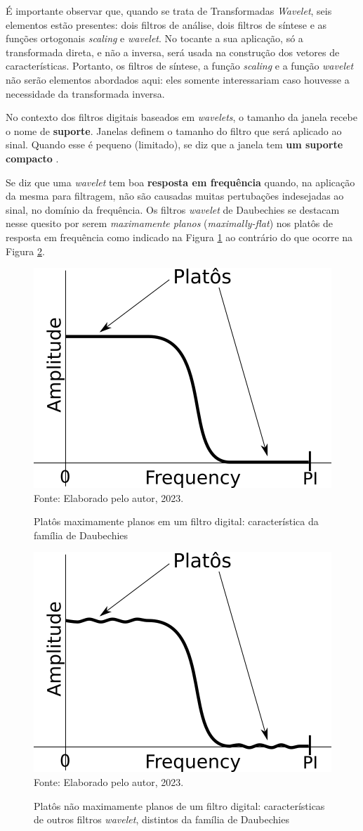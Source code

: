 			\par É importante observar que, quando se trata de Transformadas \textit{Wavelet}, seis elementos estão presentes: dois filtros de análise, dois filtros de síntese e as funções ortogonais \textit{scaling} e \textit{wavelet}. No tocante a sua aplicação, só a transformada direta, e não a inversa, será usada na construção dos vetores de características. Portanto, os filtros de síntese, a função \textit{scaling} e a função \textit{wavelet} não serão elementos abordados aqui: eles somente interessariam caso houvesse a necessidade da transformada inversa.
			
			\par No contexto dos filtros digitais baseados em \textit{wavelets}, o tamanho da janela recebe o nome de \textbf{suporte}. Janelas definem o tamanho do filtro que será aplicado ao sinal. Quando esse é pequeno (limitado), se diz que a janela tem \textbf{um suporte compacto} \cite{robi2003}.
			
			\par Se diz que uma \textit{wavelet} tem boa \textbf{resposta em frequência} quando, na aplicação da mesma para filtragem, não são causadas muitas pertubações indesejadas ao sinal, no domínio da frequência. Os filtros \textit{wavelet} de Daubechies \cite{daubechies1992ten} se destacam nesse quesito por serem \textit{maximamente planos} (\textit{maximally-flat}) \cite{butterworth1930} \cite{bianchi2007electronic} nos platôs de resposta em frequência como indicado na Figura \ref{fig:daubechies} ao contrário do que ocorre na Figura \ref{fig:nomaximallyflat}.
			
			\begin{figure}[h]
				\centering
				\caption{Platôs maximamente planos em um filtro digital: característica da família de Daubechies}
				\includegraphics[width=0.3\linewidth]{images/daubechies}
				\label{fig:daubechies}
				\\Fonte: Elaborado pelo autor, 2023.
			\end{figure}
			
			\begin{figure}[h]
				\centering
				\caption{Platôs não maximamente planos de um filtro digital: características de outros filtros \textit{wavelet}, distintos da família de Daubechies}
				\includegraphics[width=0.3\linewidth]{images/noMaximallyFlat}
				\label{fig:nomaximallyflat}
				\\Fonte: Elaborado pelo autor, 2023.
			\end{figure}
			
